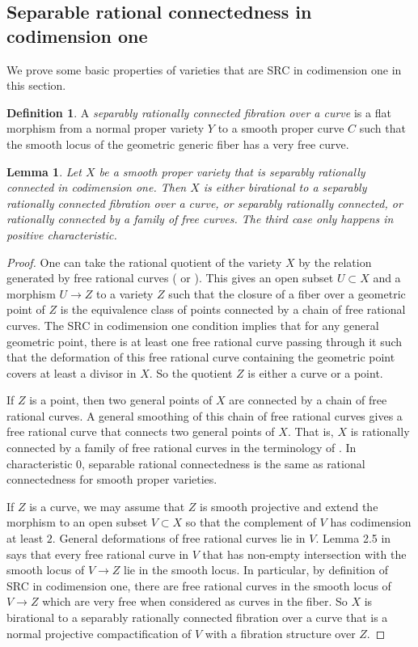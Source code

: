 \documentclass{amsart}
\newtheorem{lem}[theorem]{Lemma}
\theoremstyle{definition}
\newtheorem{defn}[theorem]{Definition}
\theoremstyle{remark}
\begin{document}
\subsection{Separable rational connectedness in codimension one}\label{sec:SRC1}
We prove some basic properties of varieties that are SRC in codimension one in this section.
\begin{defn}
    A \emph{separably rationally connected fibration over a curve} is a flat morphism from a normal proper variety $Y$ to a smooth proper curve $C$ such that the smooth locus of the geometric generic fiber has a very free curve.
\end{defn}
\begin{lem}\label{lem:classification}
    Let $X$ be a smooth proper variety that is separably rationally connected in codimension one. Then $X$ is either birational to a separably rationally connected fibration over a curve, or separably rationally connected, or rationally connected by a family of free curves. The third case only happens in positive characteristic. 
\end{lem}

\begin{proof}
    One can take the rational quotient of the variety $X$ by the relation generated by free rational curves (\cite[Example IV.4.11, Theorem IV4.13]{Kollar96} or \cite[Theorem 1.3]{starr2006maximal}). 
    This gives an open subset $U \subset X$ and a morphism $U \to Z$ to a variety $Z$ such that the closure of a fiber over a geometric point of $Z$ is the equivalence class of points connected by a chain of free rational curves. 
    The SRC in codimension one condition implies that for any general geometric point, there is at least one free rational curve passing through it such that the deformation of this free rational curve containing the geometric point covers at least a divisor in $X$. So the quotient $Z$ is either a curve or a point. 

    If $Z$ is a point, then two general points of $X$ are connected by a chain of free rational curves.  A general smoothing of this chain of free rational curves gives a free rational curve that connects two general points of $X$. That is, $X$ is rationally connected by a family of free rational curves in the terminology of \cite{ShenFRC}. In characteristic $0$, separable rational connectedness is the same as rational connectedness for smooth proper varieties. 

    If $Z$ is a curve, we may assume that $Z$ is smooth projective and extend the morphism to an open subset $V \subset X$ so that the complement of $V$ has codimension at least $2$. General deformations of free rational curves lie in $V$. Lemma 2.5 in \cite{starr2006maximal} says that every free rational curve in $V$ that has non-empty intersection with the smooth locus of $V \to Z$ lie in the smooth locus. In particular, by definition of SRC in codimension one, there are free rational curves in the smooth locus of $V \to Z$ which are very free when considered as curves in the fiber. So $X$ is birational to a separably rationally connected fibration over a curve that is a normal projective compactification of $V$ with a fibration structure over $Z$.
\end{proof}
\end{document}
